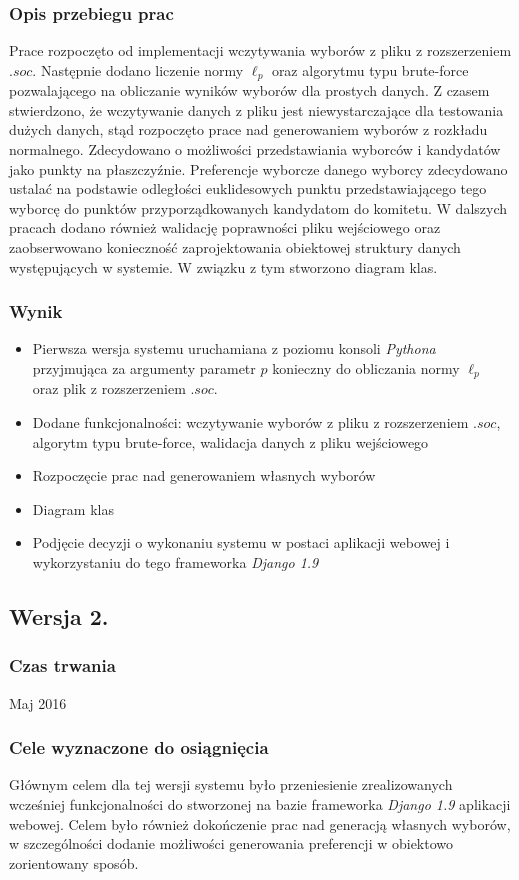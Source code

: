 \documentclass[pdflatex,11pt]{../aghdoc_version2}
\begin{document}
\subsubsection{Opis przebiegu prac}
Prace rozpoczęto od implementacji wczytywania wyborów z pliku z rozszerzeniem $.soc$.
Następnie dodano liczenie normy $\ell_p$ oraz algorytmu typu brute-force pozwalającego na
obliczanie wyników wyborów dla prostych danych. Z czasem stwierdzono, że wczytywanie
danych z pliku jest niewystarczające dla testowania dużych danych, stąd rozpoczęto prace
nad generowaniem wyborów z rozkładu normalnego. Zdecydowano o możliwości
przedstawiania wyborców i kandydatów jako punkty na płaszczyźnie. Preferencje wyborcze
danego wyborcy zdecydowano ustalać na podstawie odległości euklidesowych punktu
przedstawiającego tego wyborcę do punktów przyporządkowanych kandydatom do komitetu.
W dalszych pracach dodano również walidację poprawności pliku wejściowego oraz
zaobserwowano konieczność zaprojektowania obiektowej struktury danych występujących w
systemie. W związku z tym stworzono diagram klas.
\subsubsection{Wynik}
\begin{itemize}
\item Pierwsza wersja systemu uruchamiana z poziomu konsoli \textit{Pythona} przyjmująca za
argumenty parametr $p$ konieczny do obliczania normy $\ell_p$ oraz plik z rozszerzeniem
$.soc$.
\item Dodane funkcjonalności: wczytywanie wyborów z pliku z rozszerzeniem $.soc$,
algorytm typu brute-force, walidacja danych z pliku wejściowego
\item Rozpoczęcie prac nad generowaniem własnych wyborów
\item Diagram klas
\item Podjęcie decyzji o wykonaniu systemu w postaci aplikacji webowej i wykorzystaniu
do tego frameworka \textit{Django 1.9}
\end{itemize}
\subsection{Wersja 2.}
\subsubsection{Czas trwania}
Maj 2016
\subsubsection{Cele wyznaczone do osiągnięcia}
Głównym celem dla tej wersji systemu było przeniesienie zrealizowanych wcześniej
funkcjonalności do stworzonej na bazie frameworka \textit{Django 1.9} aplikacji webowej. Celem
było również dokończenie prac nad generacją własnych wyborów, w szczególności dodanie
możliwości generowania preferencji w obiektowo zorientowany sposób.
\end{document}
